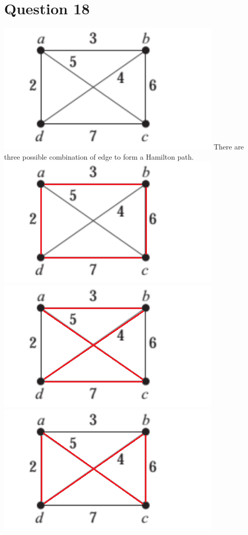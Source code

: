 \documentclass{article}
\begin{document}
\section*{Question 18}
\includegraphics[]{Question 18/connectivity_18.png}
\newline
There are three possible combination of edge to form a Hamilton path.
\newline
\includegraphics[scale = 0.7]{Question 18/connectivity_18.1.png}
\includegraphics[scale = 0.7]{Question 18/connectivity_18.2.png}
\includegraphics[scale = 0.7]{Question 18/connectivity_18.3.png}
\end{document}
